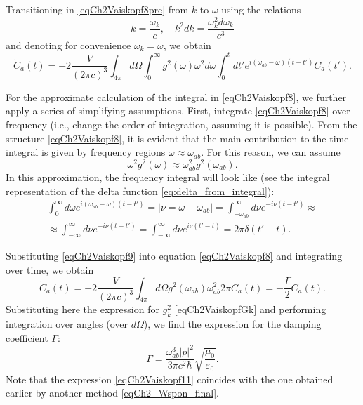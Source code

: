 Transitioning in \eqref{eqCh2Vaiskopf8pre} from $k$ to $\omega$ using the relations 
\begin{equation}
k = \frac{\omega_k}{c}, \quad k^2 dk = \frac{\omega_k^2 d \omega_k}{c^3}
\nonumber
\end{equation}
and denoting for convenience \(\omega_k = \omega\),
we obtain
\begin{equation}
\dot{C}_{a}\left(t\right) = - 
2 \frac{V}{\left(2 \pi c\right)^3} \int_{4\pi}d \Omega \int_0^{\infty}
g^2\left(\omega\right) \omega^2 d\omega  \int_0^t dt'
e^{i \left(\omega_{ab} - \omega\right)\left(t - t'\right)}  
C_{a}\left(t'\right).
\label{eqCh2Vaiskopf8}
\end{equation}

For the approximate calculation of the integral in \eqref{eqCh2Vaiskopf8}, we further apply a series of simplifying assumptions. First, integrate \eqref{eqCh2Vaiskopf8} over frequency (i.e., change the order of integration, assuming it is possible). From the structure \eqref{eqCh2Vaiskopf8}, it is evident that the main contribution to the time integral is given by frequency regions $\omega \approx \omega_{ab}$. For this reason, we can assume 
\[
\omega^2 g^2\left(\omega\right) \approx 
\omega_{ab}^2 g^2\left(\omega_{ab}\right).
\]
In this approximation, the frequency integral will look like (see the integral representation of the delta function \eqref{eq:delta_from_integral}):  
\begin{eqnarray}
\int_0^{\infty}d \omega e^{i\left(\omega_{ab} - \omega\right)\left(t -
  t'\right)}  = \left|\nu = \omega - \omega_{ab}\right| =
\int_{- \omega_{ab}}^{\infty}d \nu e^{-i \nu\left(t - t'\right)} \approx
\nonumber \\
\approx \int_{- \infty}^{\infty} d \nu e^{-i \nu\left(t - t'\right)} = 
\int_{- \infty}^{\infty} d \nu e^{i \nu\left(t' - t\right)} =
2 \pi \delta\left(t' - t\right).
\label{eqCh2Vaiskopf9}
\end{eqnarray}

Substituting \eqref{eqCh2Vaiskopf9} into equation \eqref{eqCh2Vaiskopf8} and integrating over time, we obtain
\begin{equation}
\dot{C}_{a}\left(t\right) = - 
2 \frac{V}{\left(2 \pi c\right)^3} \int_{4\pi}d \Omega 
g^2\left(\omega_{ab}\right) \omega_{ab}^2   
2 \pi C_{a}\left(t\right) = - \frac{\Gamma}{2} C_{a}\left(t\right).
\label{eqCh2Vaiskopf10}
\end{equation}
Substituting here the expression for $g_k^2$ \eqref{eqCh2VaiskopfGk} and performing integration over angles (over $d \Omega$), we find the expression for the damping coefficient $\Gamma$:
\begin{equation}
\Gamma = \frac{\omega_{ab}^3 \left|p\right|^2}{3 \pi c^2 \hbar}
\sqrt{\frac{\mu_0}{\varepsilon_0}}. 
\label{eqCh2Vaiskopf11}
\end{equation}
Note that the expression \eqref{eqCh2Vaiskopf11} coincides with the one obtained earlier by another method \eqref{eqCh2_Wspon_final}.

